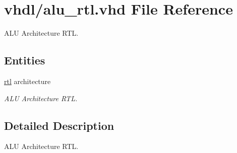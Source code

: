 \hypertarget{alu__rtl_8vhd}{}\section{vhdl/alu\+\_\+rtl.vhd File Reference}
\label{alu__rtl_8vhd}


A\+LU Architecture R\+TL.  


\subsection*{Entities}
\begin{DoxyCompactItemize}
\item 
\hyperlink{classalu_1_1rtl}{rtl} architecture
\begin{DoxyCompactList}\small\item\em A\+LU Architecture R\+TL. \end{DoxyCompactList}\end{DoxyCompactItemize}


\subsection{Detailed Description}
A\+LU Architecture R\+TL. 

